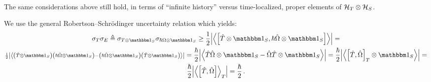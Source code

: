 The same considerations above still hold, in terms of ``infinite history'' versus
time-localized, proper elements of $\mathcal{H}_T \otimes \mathcal{H}_S$. 

We use the general Robertson--Schr\"{o}dinger uncertainty relation which yields:
\begin{multline}
  \sigma_T \sigma_E \eqbydef
  \sigma_{T \ox \idop_S} \sigma_{\hbar\Omega \ox \idop_S} \geq
  \frac{1}{2} \abs{\expval{\comm
    {\hat{T}\ox\idop_S} {\hbar\hat{\Omega}\ox\idop_S}
  }} =
  \\
  {\scriptstyle
    \frac{1}{2} \abs{\expval{
      \qty(\hat{T}\ox\idop_S) \qty(\hbar\hat{\Omega}\ox\idop_S) -
      \qty(\hbar\hat{\Omega}\ox\idop_S) \qty(\hat{T}\ox\idop_S)
    }}
  } =
  \frac{\hbar}{2} \abs{\expval{
    \hat{T}\hat{\Omega}\ox\idop_S - \hat{\Omega}\hat{T}\ox\idop_S
  }} =
  \frac{\hbar}{2} \abs{\expval{
    \comm{\hat{T}}{\hat{\Omega}}_T \ox \idop_S
  }} =
  \\
  \frac{\hbar}{2} \abs{\expval{\comm
    {\hat{T}}{\hat{\Omega}}
  }_T} =
  \frac{\hbar}{2}
  \,\text{.}
\end{multline}
